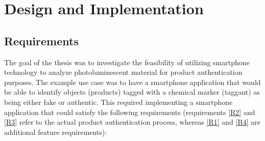 \documentclass[thesis.tex]{subfiles}
\begin{document}
\chapter{Design and Implementation}
\label{chapter:design-implementation}

\section{Requirements}

The goal of the thesis was to investigate the feasibility of utilizing smartphone technology to analyze photoluminescent material for product authentication purposes. The example use case was to have a smartphone application that would be able to identify objects (products) tagged with a chemical marker (taggant) as being either fake or authentic. This required implementing a smartphone application that could satisfy the following requirements (requirements \ref{R2} and \ref{R3} refer to the actual product authentication process, whereas \ref{R1} and \ref{R4} are additional feature requirements):
\end{document}

